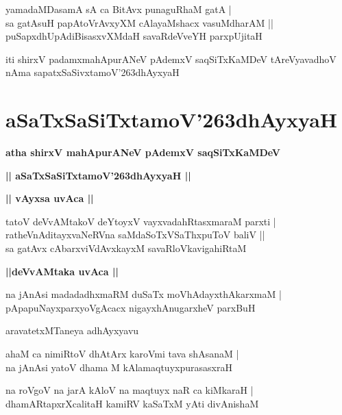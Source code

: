 \documentclass[twoside,12pt,openright]{book}
\def\S{\char'263}
\newcounter{shloka}[chapter]
\def\uvaca#1{\centerline{{\large\textbf{#1}}}}
\begin{document}
\begin{shloka}%
yamadaMDasamA sA ca BitAvx punaguRhaM gatA |\\
sa gatAsuH papAtoVrAvxyXM cAlayaMshacx vasuMdharAM ||\\
puSapxdhUpAdiBisasxvXMdaH savaRdeVveYH parxpUjitaH 
\end{shloka}

\begin{center}
iti shirxV padamxmahApurANeV pAdemxV saqSiTxKaMDeV tAreVyavadhoV nAma sapatxSaSivxtamoV\S dhAyxyaH 
\end{center}

\chapter{aSaTxSaSiTxtamoV\S dhAyxyaH}

\begin{center}
{\LARGE\bfseries atha shirxV mahApurANeV pAdemxV saqSiTxKaMDeV}
\end{center}

\begin{center}
{\LARGE\bfseries || aSaTxSaSiTxtamoV\S dhAyxyaH || }
\end{center}

\uvaca{|| vAyxsa uvAca ||}

\begin{shloka}%
tatoV deVvAMtakoV deYtoyxV vayxvadahRtasxmaraM parxti |\\
ratheVnAditayxvaNeRVna saMdaSoTxVSaThxpuToV baliV ||\\
sa gatAvx cAbarxviVdAvxkayxM savaRloVkavigahiRtaM 
\end{shloka}

\uvaca{||deVvAMtaka uvAca ||}

\begin{shloka}%
na jAnAsi madadadhxmaRM duSaTx moVhAdayxthAkarxmaM |\\
pApapuNayxparxyoVgAcacx nigayxhAnugarxheV parxBuH 
\end{shloka}

\begin{center}
aravatetxMTaneya adhAyxyavu
\end{center}

\begin{shloka}%
ahaM ca nimiRtoV dhAtArx karoVmi tava shAsanaM |\\
na jAnAsi yatoV dhama M kAlamaqtuyxpurasasxraH 
\end{shloka}

\begin{shloka}%
na roVgoV na jarA kAloV na maqtuyx naR ca kiMkaraH |\\
dhamARtapxrXcalitaH kamiRV kaSaTxM yAti divAnishaM 
\end{shloka}
\end{document}
